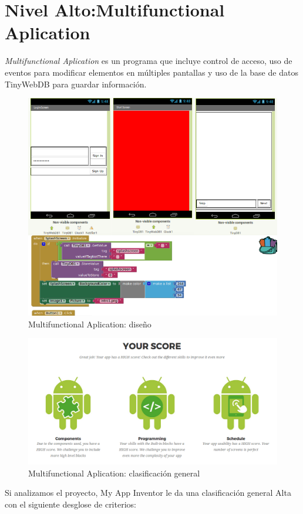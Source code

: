 \documentclass[a4paper, 12pt]{book}
\begin{document}
\section{Nivel Alto:Multifunctional Aplication} 
\textit{Multifunctional Aplication} es un programa que incluye control de acceso, uso de eventos para modificar elementos en múltiples pantallas y uso de la base de datos TinyWebDB para guardar información. 
\begin{figure}[H]
  \centering
  \includegraphics[width=0.60\linewidth, keepaspectratio]{img/MultiApp}
  \caption{Multifunctional Aplication: diseño}
  \label{fig:MultifunctionalApp}
\end{figure}
\begin{figure}[H]
  \centering
  \includegraphics[width=\linewidth, keepaspectratio]{img/MultifunctionalAppGlobal}
  \caption{Multifunctional Aplication: clasificación general}
  \label{fig:MultifunctionalApp}
\end{figure}
Si analizamos el proyecto, My App Inventor le da una clasificación general Alta con el siguiente desglose de criterios:
\end{document}
